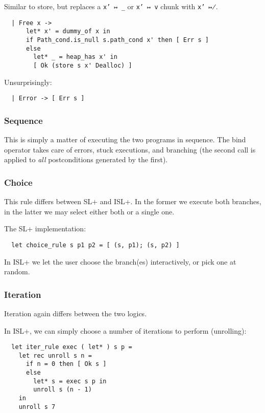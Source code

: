 \documentclass[parskip=half]{scrartcl}
\begin{document}

Similar to store, but replaces a \texttt{x' ↦ \_} or \texttt{x' ↦ v} chunk with \texttt{x' ↦̸}.

\begin{verbatim}
  | Free x ->
      let* x' = dummy_of x in
      if Path_cond.is_null s.path_cond x' then [ Err s ]
      else
        let* _ = heap_has x' in
        [ Ok (store s x' Dealloc) ]
\end{verbatim}


Unsurprisingly:

\begin{verbatim}
  | Error -> [ Err s ]
\end{verbatim}

\subsubsection{Sequence}

This is simply a matter of executing the two programs in sequence. The bind operator takes care of errors, stuck executions, and branching (the second  call is applied to \emph{all} postconditions generated by the first).

\subsubsection{Choice}

This rule differs between SL+ and ISL+. In the former we execute both branches, in the latter we may select either both or a single one.

The SL+ implementation:
\begin{verbatim}
  let choice_rule s p1 p2 = [ (s, p1); (s, p2) ]
\end{verbatim}

In ISL+ we let the user choose the branch(es) interactively, or pick one at random.

\subsubsection{Iteration}

Iteration again differs between the two logics.

In ISL+, we can simply choose a number of iterations to perform (unrolling):
\begin{verbatim}
  let iter_rule exec ( let* ) s p =
    let rec unroll s n =
      if n = 0 then [ Ok s ]
      else
        let* s = exec s p in
        unroll s (n - 1)
    in
    unroll s 7
\end{verbatim}
\end{document}
